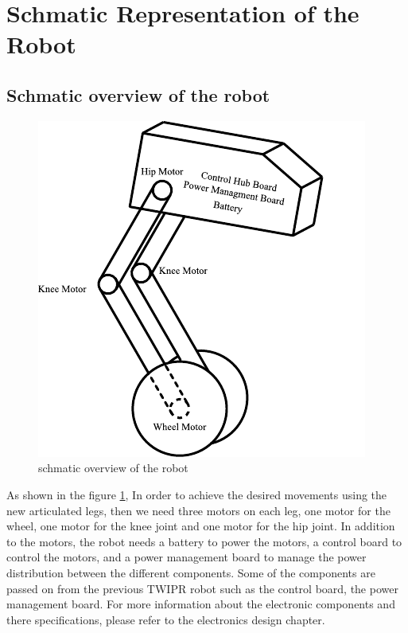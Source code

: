 \section{Schmatic Representation of the Robot}
\subsection{Schmatic overview of the robot}
\begin{figure}[h]
	\centering
	\includegraphics[width=0.5\linewidth]{Schmatic Overview of the robot}
	\caption[schmatic overview of the robot]{schmatic overview of the robot}
	\label{fig:schmaticoverviewoftherobot}
\end{figure}
As shown in the figure \ref{fig:schmaticoverviewoftherobot}, In order to achieve the desired movements using the new articulated legs, then we need three motors on each leg, one motor for the wheel, one motor for the knee joint and one motor for the hip joint.
In addition to the motors, the robot needs a battery to power the motors, a control board to control the motors, and a power management board to manage the power distribution between the different components. Some of the components  are passed on from the previous TWIPR robot such as the control board, the power management board. For more information about the electronic components and there specifications, please refer to the electronics design chapter.

